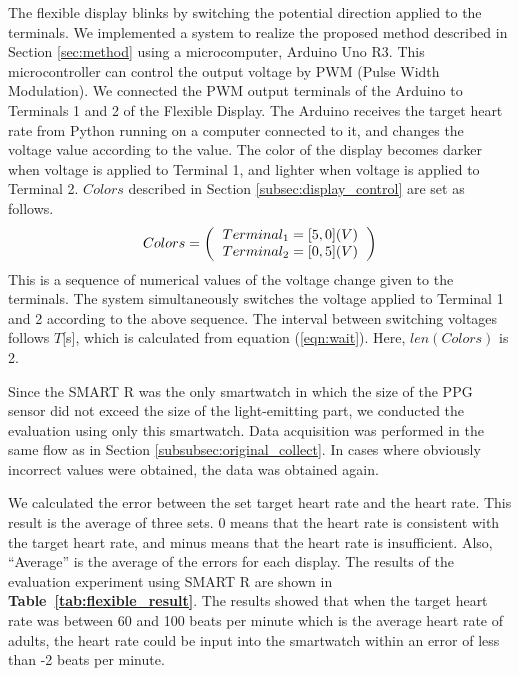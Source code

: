 \documentclass[sigchi,authordraft]{acmart}
\newcommand\tabref[1]{\textbf{Table~\ref{tab:#1}}}
\begin{document}
The flexible display blinks by switching the potential direction applied to the terminals. We implemented a system to realize the proposed method described in Section \ref{sec:method} using a microcomputer, Arduino Uno R3. This microcontroller can control the output voltage by PWM (Pulse Width Modulation). We connected the PWM output terminals of the Arduino to Terminals 1 and 2 of the Flexible Display. The Arduino receives the target heart rate from Python running on a computer connected to it, and changes the voltage value according to the value. The color of the display becomes darker when voltage is applied to Terminal 1, and lighter when voltage is applied to Terminal 2. $Colors$ described in Section \ref{subsec:display_control} are set as follows.
\begin{equation*}
  \begin{split}
  Colors = \left(
  \begin{tabular}{l}
  $Terminal_{1} = [5, 0] (V)$ \\
  $Terminal_{2} = [0, 5] (V)$
  \end{tabular}
  \right)
  \end{split}
\end{equation*}
This is a sequence of numerical values of the voltage change given to the terminals. The system simultaneously switches the voltage applied to Terminal 1 and 2 according to the above sequence. The interval between switching voltages follows $T$[s], which is calculated from equation (\ref{eqn:wait}). Here, $len(Colors)$ is 2.\par

Since the SMART R was the only smartwatch in which the size of the PPG sensor did not exceed the size of the light-emitting part, we conducted the evaluation using only this smartwatch. Data acquisition was performed in the same flow as in Section \ref{subsubsec:original_collect}. In cases where obviously incorrect values were obtained, the data was obtained again.\par

We calculated the error between the set target heart rate and the heart rate. This result is the average of three sets. 0 means that the heart rate is consistent with the target heart rate, and minus means that the heart rate is insufficient. Also, ``Average'' is the average of the errors for each display. The results of the evaluation experiment using SMART R are shown in \tabref{flexible_result}. The results showed that when the target heart rate was between 60 and 100 beats per minute which is the average heart rate of adults, the heart rate could be input into the smartwatch within an error of less than -2 beats per minute.
\end{document}
